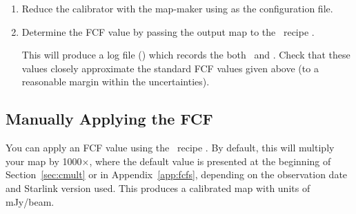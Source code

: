 \begin{enumerate}
\item Reduce the calibrator with the map-maker using
   as the configuration file.

\item Determine the FCF value by passing the output map to the
  \picard\ recipe
  .

\begin{terminalv}
\end{terminalv}

This will produce a log file () which records the
both \fcfb\ and \fcfa. Check that these values closely approximate the
standard FCF values given above (to a reasonable margin within the 
uncertainties).




\end{enumerate}

\subsection{Manually Applying the FCF}
\label{subsec:ApplyingFCF}

You can apply an FCF value using the \picard\ recipe
.
By default, this will multiply your map by 1000$\times$\fcfb, where the default \fcfb
value is presented at the beginning of Section~\ref{sec:cmult} or in Appendix~\ref{app:fcfs},
depending on the observation date and Starlink version used. This produces a 
calibrated map with units of mJy/beam.

